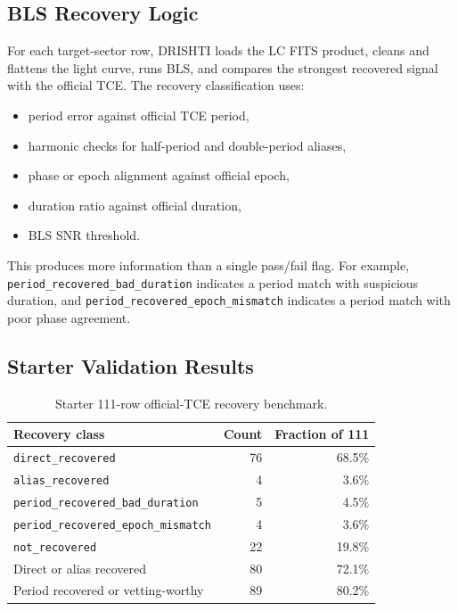 \documentclass[11pt,a4paper]{article}
\newcommand{\code}[1]{\texttt{#1}}
\newcommand{\pct}[1]{#1\%}
\begin{document}
\subsection{BLS Recovery Logic}

For each target-sector row, DRISHTI loads the LC FITS product, cleans and flattens the light curve, runs BLS, and compares the strongest recovered signal with the official TCE. The recovery classification uses:

\begin{itemize}
  \item period error against official TCE period,
  \item harmonic checks for half-period and double-period aliases,
  \item phase or epoch alignment against official epoch,
  \item duration ratio against official duration,
  \item BLS SNR threshold.
\end{itemize}

This produces more information than a single pass/fail flag. For example, \code{period_recovered_bad_duration} indicates a period match with suspicious duration, and \code{period_recovered_epoch_mismatch} indicates a period match with poor phase agreement.

\subsection{Starter Validation Results}

\begin{table}[H]
\centering
\caption{Starter 111-row official-TCE recovery benchmark.}
\begin{tabular}{@{}lrr@{}}
\toprule
Recovery class & Count & Fraction of 111 \\
\midrule
\code{direct_recovered} & 76 & \pct{68.5} \\
\code{alias_recovered} & 4 & \pct{3.6} \\
\code{period_recovered_bad_duration} & 5 & \pct{4.5} \\
\code{period_recovered_epoch_mismatch} & 4 & \pct{3.6} \\
\code{not_recovered} & 22 & \pct{19.8} \\
\midrule
Direct or alias recovered & 80 & \pct{72.1} \\
Period recovered or vetting-worthy & 89 & \pct{80.2} \\
\bottomrule
\end{tabular}
\end{table}
\end{document}
